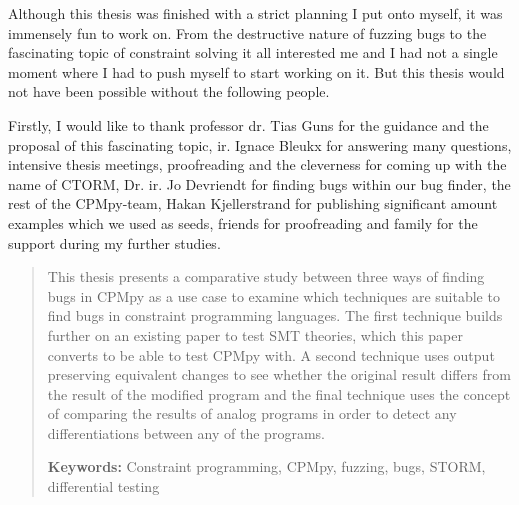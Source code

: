 \documentclass[master=cws,masteroption=se,english]{kulemt} %
\begin{document}
\begin{preface}
Although this thesis was finished with a strict planning I put onto myself, it was immensely fun to work on. From the destructive nature of fuzzing bugs to the fascinating topic of constraint solving it all interested me and I had not a single moment where I had to push myself to start working on it. But this thesis would not have been possible without the following people.


\noindent Firstly, I would like to thank 
professor dr. Tias Guns for the guidance and the proposal of this fascinating topic,
ir. Ignace Bleukx for answering many questions, intensive thesis meetings, proofreading and the cleverness for coming up with the name of CTORM, 
Dr. ir. Jo Devriendt for finding bugs within our bug finder, 
the rest of the CPMpy-team, 
Hakan Kjellerstrand for publishing significant amount examples which we used as seeds,
friends for proofreading and 
family for the support during my further studies.
\end{preface}

\listoftodos
{}
\tableofcontents*
\setcounter{tocdepth}{5} %

\begin{abstract}
This thesis presents a comparative study between three ways of finding bugs in CPMpy as a use case to examine which techniques are suitable to find bugs in constraint programming languages. 
The first technique builds further on an existing paper to test SMT theories, which this paper converts to be able to test CPMpy with. 
A second technique uses output preserving equivalent changes to see whether the original result differs from the result of the modified program and 
the final technique uses the concept of comparing the results of analog programs in order to detect any differentiations between any of the programs. 

\vspace*{\fill}
\noindent
\textbf{Keywords:} Constraint programming, CPMpy, fuzzing, bugs, STORM, differential testing
\end{abstract}
\end{document}
